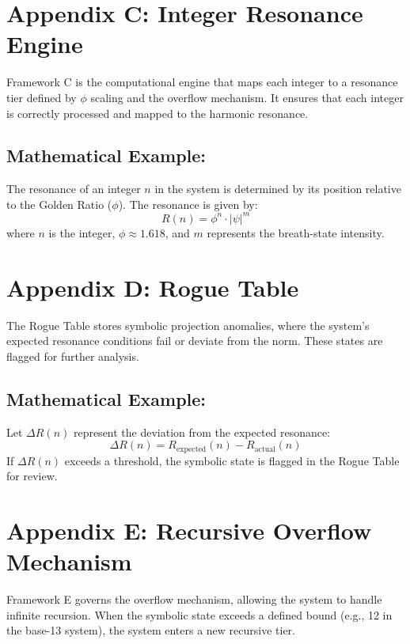 \documentclass[12pt]{article}
\begin{document}
\newpage

\section*{Appendix C: Integer Resonance Engine}

Framework C is the computational engine that maps each integer to a resonance tier defined by $\phi$ scaling and the overflow mechanism. It ensures that each integer is correctly processed and mapped to the harmonic resonance.

\subsection*{Mathematical Example:}
The resonance of an integer $n$ in the system is determined by its position relative to the Golden Ratio ($\phi$). The resonance is given by:
\[
R(n) = \phi^n \cdot \left|\psi\right|^m
\]
where $n$ is the integer, $\phi \approx 1.618$, and $m$ represents the breath-state intensity.

\newpage

\section*{Appendix D: Rogue Table}

The Rogue Table stores symbolic projection anomalies, where the system's expected resonance conditions fail or deviate from the norm. These states are flagged for further analysis.

\subsection*{Mathematical Example:}
Let $\Delta R(n)$ represent the deviation from the expected resonance:
\[
\Delta R(n) = R_{\text{expected}}(n) - R_{\text{actual}}(n)
\]
If $\Delta R(n)$ exceeds a threshold, the symbolic state is flagged in the Rogue Table for review.

\newpage

\section*{Appendix E: Recursive Overflow Mechanism}

Framework E governs the overflow mechanism, allowing the system to handle infinite recursion. When the symbolic state exceeds a defined bound (e.g., 12 in the base-13 system), the system enters a new recursive tier.
\end{document}
